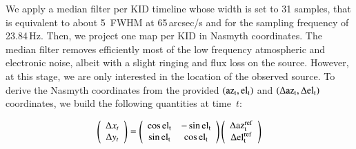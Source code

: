 We apply a median filter per KID timeline whose width is set to 31
samples, that is equivalent to about 5~FWHM at 65\,arcsec/s and for the
sampling frequency of
23.84\,Hz. Then, we project one map per KID in Nasmyth
coordinates. The median filter removes
efficiently most of the low frequency atmospheric and electronic
noise, albeit with a slight ringing and flux loss on the
source. However, at this stage, we are only interested in the location
of the observed source.
To derive the Nasmyth coordinates from the
provided $(\rm{az}_t,\rm{el}_t)$ and $(\Delta\rm{az}_t,\Delta\rm{el}_t)$
coordinates, we build the following quantities at time~$t$:


\begin{equation}
\left( {\begin{array}{c}
\Delta x_t\\
\Delta y_t \\
\end{array}} \right) = 
\left( {\begin{array}{cc}
\cos\rm{el}_t & - \sin\rm{el}_t  \\
\sin \rm{el}_t & \cos \rm{el}_t \\
\end{array}} \right)
\left( {\begin{array}{c}
\Delta \rm{az}_t^{\rm{ref}}\\
\Delta \rm{el}_t^{\rm{ref}} \\
\end{array}} \right)
\end{equation}

